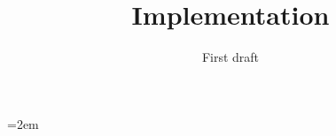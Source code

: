 \documentclass[a4paper,english]{report}
\begin{document}
\title{Implementation}

\subtitle{First draft}

\maketitle



\newpage

\emergencystretch=2em

\printbibliography
\end{document}
